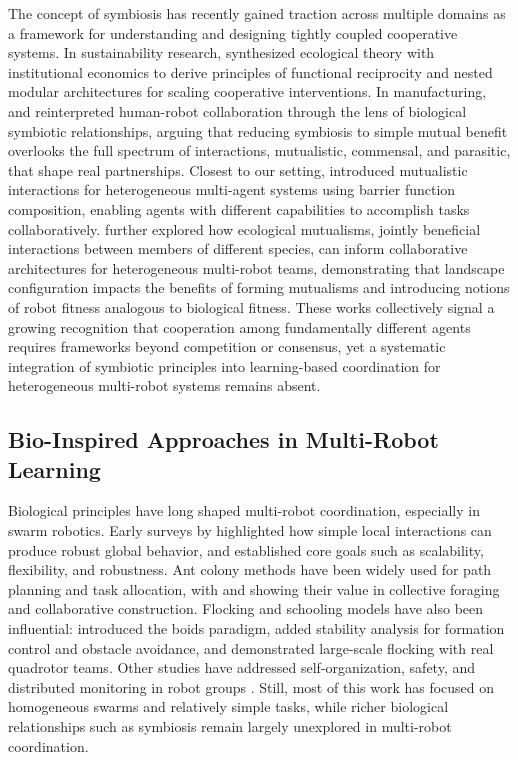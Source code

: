 \documentclass[Afour,sageh,times]{sagej}
\begin{document}
The concept of symbiosis has recently gained traction across multiple domains as a framework for understanding and designing tightly coupled cooperative systems. In sustainability research, \citet{cao2025designing} synthesized ecological theory with institutional economics to derive principles of functional reciprocity and nested modular architectures for scaling cooperative interventions. In manufacturing, \citet{barravecchia2023redefining} and \citet{wu2026empowering} reinterpreted human-robot collaboration through the lens of biological symbiotic relationships, arguing that reducing symbiosis to simple mutual benefit overlooks the full spectrum of interactions, mutualistic, commensal, and parasitic, that shape real partnerships. Closest to our setting, \citet{nguyen2023mutualistic} introduced mutualistic interactions for heterogeneous multi-agent systems using barrier function composition, enabling agents with different capabilities to accomplish tasks collaboratively. \citet{nguyen2025mutualisms} further explored how ecological mutualisms, jointly beneficial interactions between members of different species, can inform collaborative architectures for heterogeneous multi-robot teams, demonstrating that landscape configuration impacts the benefits of forming mutualisms and introducing notions of robot fitness analogous to biological fitness. These works collectively signal a growing recognition that cooperation among fundamentally different agents requires frameworks beyond competition or consensus, yet a systematic integration of symbiotic principles into learning-based coordination for heterogeneous multi-robot systems remains absent.

\subsection{Bio-Inspired Approaches in Multi-Robot Learning}
Biological principles have long shaped multi-robot coordination, especially in swarm robotics. Early surveys by \citet{sahin2005Swarm} highlighted how simple local interactions can produce robust global behavior, and established core goals such as scalability, flexibility, and robustness. Ant colony methods have been widely used for path planning and task allocation, with \citet{dorigo2019Ant} and \citet{garnier2007Biological} showing their value in collective foraging and collaborative construction. Flocking and schooling models have also been influential: \citet{reynolds1987Flocks} introduced the boids paradigm, \citet{tanner2007Flocking} added stability analysis for formation control and obstacle avoidance, and \citet{vasarhelyi2018Optimized} demonstrated large-scale flocking with real quadrotor teams. Other studies have addressed self-organization, safety, and distributed monitoring in robot groups \citep{trianni2006Selforganisation, winfield2006Safety, fagiolini2024Distributed}. Still, most of this work has focused on homogeneous swarms and relatively simple tasks, while richer biological relationships such as symbiosis remain largely unexplored in multi-robot coordination.
\end{document}
